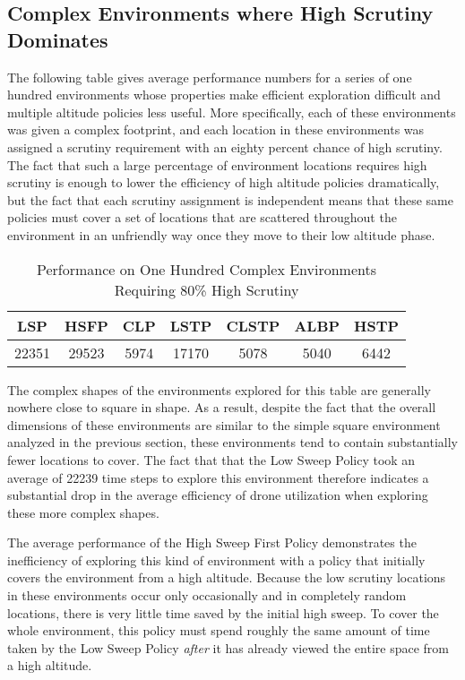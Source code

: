 \subsection{Complex Environments where High Scrutiny Dominates}

The following table gives average performance numbers for a series of one hundred environments whose properties make efficient exploration difficult and multiple altitude policies less useful. More specifically, each of these environments was given a complex footprint, and each location in these environments was assigned a scrutiny requirement with an eighty percent chance of high scrutiny. The fact that such a large percentage of environment locations requires high scrutiny is enough to lower the efficiency of high altitude policies dramatically, but the fact that each scrutiny assignment is independent means that these same policies must cover a set of locations that are scattered throughout the environment in an unfriendly way once they move to their low altitude phase.

\begin{table}[h]
\begin{center}
 \begin{tabular}{||c c c c c c c ||}
 \hline
 LSP   & HSFP  & CLP  & LSTP  & CLSTP & ALBP & HSTP \\
 \hline
 22351 & 29523 & 5974 & 17170 & 5078  & 5040 & 6442 \\
 \hline
 \end{tabular}
\end{center}
\caption{Performance on One Hundred Complex Environments Requiring 80\% High Scrutiny}
\end{table}

The complex shapes of the environments explored for this table are generally nowhere close to square in shape. As a result, despite the fact that the overall dimensions of these environments are similar to the simple square environment analyzed in the previous section, these environments tend to contain substantially fewer locations to cover. The fact that that the Low Sweep Policy took an average of 22239 time steps to explore this environment therefore indicates a substantial drop in the average efficiency of drone utilization when exploring these more complex shapes.

The average performance of the High Sweep First Policy demonstrates the inefficiency of exploring this kind of environment with a policy that initially covers the environment from a high altitude. Because the low scrutiny locations in these environments occur only occasionally and in completely random locations, there is very little time saved by the initial high sweep. To cover the whole environment, this policy must spend roughly the same amount of time taken by the Low Sweep Policy \textit{after} it has already viewed the entire space from a high altitude.

